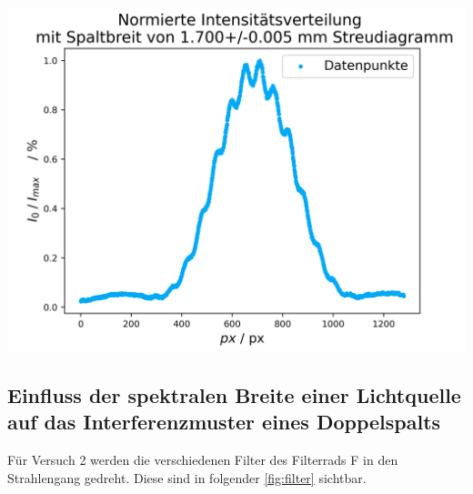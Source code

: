 \documentclass[11pt,ngerman]{scrartcl}
\begin{document}
\begin{center}
	\begin{minipage}[t]{0.5\textwidth}
		\includegraphics[width=\textwidth]{auswertung/1_49konstrast}
	\end{minipage}
\end{center}


\newpage



\subsection{Einfluss der spektralen Breite einer Lichtquelle auf das Interferenzmuster eines Doppelspalts}

Für Versuch 2 werden die verschiedenen Filter des Filterrads F in den Strahlengang gedreht. Diese sind in folgender \autoref{fig:filter} sichtbar.
\end{document}
